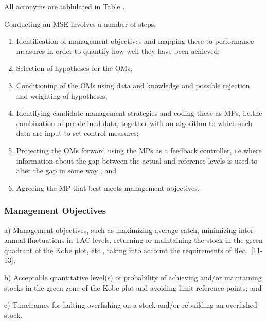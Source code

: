 \documentclass[%
nonumbib,      %
%
]{nrc1}                          %
\begin{document}
All acronyms are tablulated in Table \label{tab:acronyms}.

Conducting an MSE involves a number of steps, \cite[i.e. after][]{punt2007developing}

\begin{enumerate}
 \item Identification of management objectives and mapping these to performance measures in order to quantify how well they have been achieved;
 \item Selection of hypotheses for the OMs;
 \item Conditioning of the OMs using data and knowledge and possible rejection and weighting of hypotheses;
 \item Identifying candidate management strategies and coding these as MPs, i.e.the combination of pre-defined data, together with an algorithm to which such data are input to set control measures;
 \item Projecting the OMs forward using the MPs as a feedback controller, i.e.where information about the gap between the actual and reference levels is used to alter the gap in some way \citep{ramaprasad1983definition}; and
 \item Agreeing the MP that best meets management objectives.
\end{enumerate}

\subsubsection*{Management Objectives} 


a) Management objectives, such as maximizing average catch, minimizing inter-annual fluctuations in TAC levels, returning or maintaining the stock in the green quadrant of the Kobe plot, etc., taking into account the requirements of Rec. [11-13];

b) Acceptable quantitative level(s) of probability of achieving and/or maintaining stocks in the green zone of the Kobe plot and avoiding limit reference points; and

c) Timeframes for halting overfishing on a stock and/or rebuilding an overfished stock. 


\end{document}
